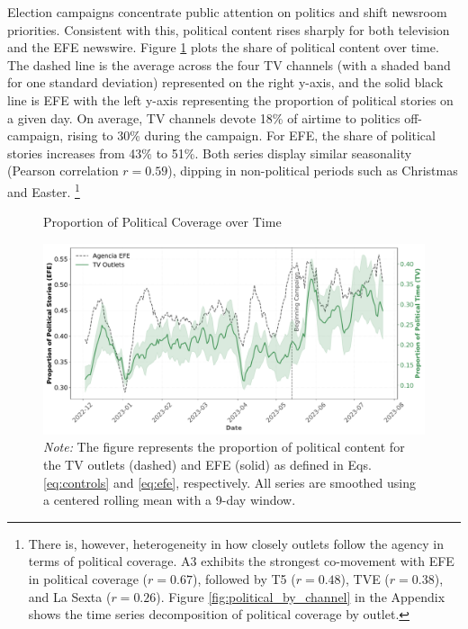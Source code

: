 \documentclass[12pt]{article}
\begin{document}
		
	
	
Election campaigns concentrate public attention on politics and shift newsroom priorities. Consistent with this, political content rises sharply for both television and the EFE newswire. Figure \ref{fig:coverage} plots the share of political content over time. The dashed line is the average across the four TV channels (with a shaded band for one standard deviation) represented on the right  y-axis, and the solid black line is  EFE with the left y-axis representing the proportion of political stories on a given day. On average, TV channels devote 18\% of airtime to politics off-campaign, rising to 30\% during the campaign. For EFE, the share of political stories increases from 43\% to 51\%. Both series display similar seasonality (Pearson correlation  $r=0.59$), dipping in non-political periods such as Christmas and Easter. \footnote{	There is, however, heterogeneity in how closely outlets follow the agency in terms of political coverage. A3 exhibits the strongest co-movement with EFE in political coverage ($r=0.67$), followed by T5 ($r=0.48$), TVE ($r=0.38$), and La Sexta ($r=0.26$). Figure \ref{fig:political_by_channel} in the Appendix shows the time series decomposition of political coverage by outlet.}
	

	
	
		
	\begin{figure}[!htb]
		\caption{Proportion of Political Coverage over Time}
		\centering
				\includegraphics[width=150mm]{figures/political_words_both}
		\caption*{\small \textit{Note:} The figure represents the proportion of political content for the TV outlets (dashed) and  EFE (solid) as defined in Eqs. \eqref{eq:controls} and \eqref{eq:efe}, respectively. All series are smoothed using a centered rolling mean with a 9-day window.}
		\label{fig:coverage}
	\end{figure}
	
\end{document}
